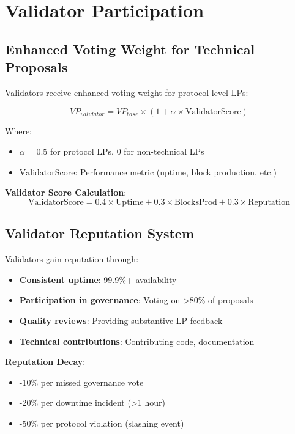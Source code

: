 \section{Validator Participation}


\subsection{Enhanced Voting Weight for Technical Proposals}

Validators receive enhanced voting weight for protocol-level LPs:

\begin{equation}
VP_{validator} = VP_{base} \times (1 + \alpha \times \text{ValidatorScore})
\end{equation}

Where:
\begin{itemize}
\item $\alpha = 0.5$ for protocol LPs, $0$ for non-technical LPs
\item $\text{ValidatorScore}$: Performance metric (uptime, block production, etc.)
\end{itemize}

\textbf{Validator Score Calculation}:
\begin{equation}
\text{ValidatorScore} = 0.4 \times \text{Uptime} + 0.3 \times \text{BlocksProd} + 0.3 \times \text{Reputation}
\end{equation}

\subsection{Validator Reputation System}

Validators gain reputation through:
\begin{itemize}
\item \textbf{Consistent uptime}: 99.9\%+ availability
\item \textbf{Participation in governance}: Voting on >80\% of proposals
\item \textbf{Quality reviews}: Providing substantive LP feedback
\item \textbf{Technical contributions}: Contributing code, documentation
\end{itemize}

\textbf{Reputation Decay}:
\begin{itemize}
\item -10\% per missed governance vote
\item -20\% per downtime incident (>1 hour)
\item -50\% per protocol violation (slashing event)
\end{itemize}

